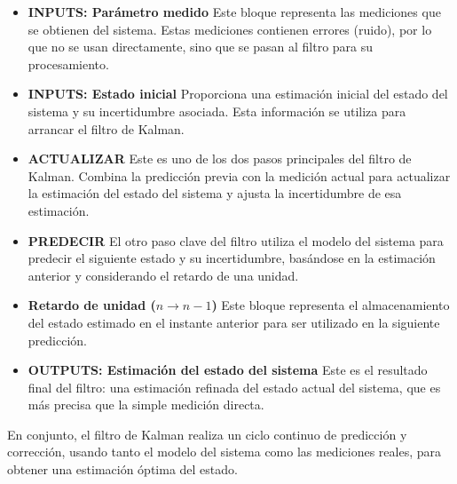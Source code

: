 \documentclass[11pt,spanish,listoffigures,listoftables]{tfgetsinf}
\begin{document}
\begin{itemize}
   \item \textbf{INPUTS: Parámetro medido}
   Este bloque representa las mediciones que se obtienen del sistema. Estas mediciones contienen errores (ruido), por lo que no se usan directamente, sino que se pasan al filtro para su procesamiento.

   \item \textbf{INPUTS: Estado inicial}
   Proporciona una estimación inicial del estado del sistema y su incertidumbre asociada. Esta información se utiliza para arrancar el filtro de Kalman.

   \item \textbf{ACTUALIZAR}
   Este es uno de los dos pasos principales del filtro de Kalman. Combina la predicción previa con la medición actual para actualizar la estimación del estado del sistema y ajusta la incertidumbre de esa estimación.

   \item \textbf{PREDECIR}
   El otro paso clave del filtro utiliza el modelo del sistema para predecir el siguiente estado y su incertidumbre, basándose en la estimación anterior y considerando el retardo de una unidad.

   \item \textbf{Retardo de unidad (\(n \rightarrow n{-}1\))}
   Este bloque representa el almacenamiento del estado estimado en el instante anterior para ser utilizado en la siguiente predicción.

   \item \textbf{OUTPUTS: Estimación del estado del sistema}
   Este es el resultado final del filtro: una estimación refinada del estado actual del sistema, que es más precisa que la simple medición directa.
\end{itemize}

En conjunto, el filtro de Kalman realiza un ciclo continuo de predicción y corrección, usando tanto el modelo del sistema como las mediciones reales, para obtener una estimación óptima del estado.
\end{document}
